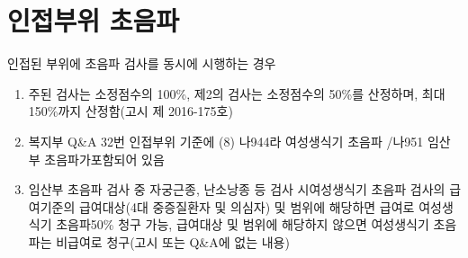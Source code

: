 \section{인접부위 초음파}
인접된 부위에 초음파 검사를 동시에 시행하는 경우
\begin{enumerate}[①]\tightlist
\item 주된 검사는 소정점수의 100\%, 제2의 검사는 소정점수의 50\%를 산정하며, 최대 150\%까지 산정함(고시 제 2016-175호)
\item 복지부 \textsf{Q\&A} 32번 인접부위 기준에 (8) 나944라 여성생식기 초음파 /나951 임산부 초음파가포함되어 있음
\item 임산부 초음파 검사 중 자궁근종, 난소낭종 등 검사 시여성생식기 초음파 검사의 급여기준의 급여대상(4대 중증질환자 및 의심자) 및 범위에 해당하면 급여로 여성생식기 초음파50\% 청구 가능, 급여대상 및 범위에 해당하지 않으면 여성생식기 초음파는 비급여로 청구(고시 또는 \textsf{Q\&A}에 없는 내용)
\end{enumerate}